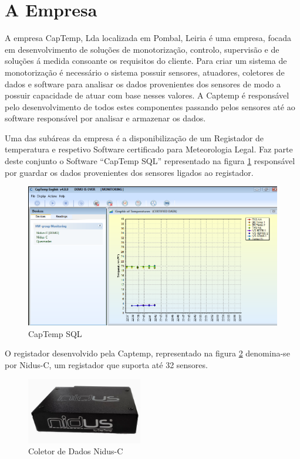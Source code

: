 \section{A Empresa}
\par
A empresa CapTemp, Lda localizada em Pombal, Leiria é uma empresa, focada em desenvolvimento de soluções de monotorização, controlo, supervisão e de soluções á medida consoante os requisitos do cliente. Para criar um sistema de monotorização é necessário o sistema possuir sensores, atuadores, coletores de dados e software para analisar os dados provenientes dos sensores de modo a possuir capacidade de atuar com base nesses valores. A Captemp é responsável pelo desenvolvimento de todos estes componentes passando pelos sensores até ao software responsável por analisar e armazenar os dados.\par
Uma das subáreas da empresa é a disponibilização de um Registador de temperatura e respetivo Software certificado para Meteorologia Legal.
Faz parte deste conjunto o Software “CapTemp SQL” representado na figura \ref{figcaptempsql} responsável por guardar os dados provenientes dos sensores ligados ao registador.\par
\begin{figure}[ht]
  \centering
  \includegraphics[width=1.00\textwidth]{images/captemp.png}
  \caption{CapTemp SQL}\label{figcaptempsql}
\end{figure}
O registador desenvolvido pela Captemp, representado na figura \ref{fignidusCl} denomina-se por Nidus-C, um registador que suporta até 32 sensores.\par

\begin{figure}[ht]
  \centering
  \includegraphics[width=0.45\textwidth]{images/nidus.jpg}
  \caption{Coletor de Dados Nidus-C}\label{fignidusCl}
\end{figure}

